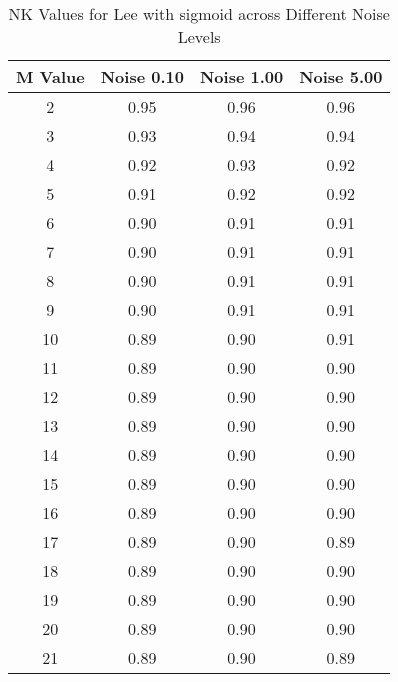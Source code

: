 \begin{table}[htb]
\small
\centering
\begin{tabular}{|c|c|c|c|} \hline
M Value & Noise 0.10 & Noise 1.00 & Noise 5.00 \\ \hline
2 & 0.95 & 0.96 & 0.96 \\ \hline
3 & 0.93 & 0.94 & 0.94 \\ \hline
4 & 0.92 & 0.93 & 0.92 \\ \hline
5 & 0.91 & 0.92 & 0.92 \\ \hline
6 & 0.90 & 0.91 & 0.91 \\ \hline
7 & 0.90 & 0.91 & 0.91 \\ \hline
8 & 0.90 & 0.91 & 0.91 \\ \hline
9 & 0.90 & 0.91 & 0.91 \\ \hline
10 & 0.89 & 0.90 & 0.91 \\ \hline
11 & 0.89 & 0.90 & 0.90 \\ \hline
12 & 0.89 & 0.90 & 0.90 \\ \hline
13 & 0.89 & 0.90 & 0.90 \\ \hline
14 & 0.89 & 0.90 & 0.90 \\ \hline
15 & 0.89 & 0.90 & 0.90 \\ \hline
16 & 0.89 & 0.90 & 0.90 \\ \hline
17 & 0.89 & 0.90 & 0.89 \\ \hline
18 & 0.89 & 0.90 & 0.90 \\ \hline
19 & 0.89 & 0.90 & 0.90 \\ \hline
20 & 0.89 & 0.90 & 0.90 \\ \hline
21 & 0.89 & 0.90 & 0.89 \\ \hline
\end{tabular}
\caption{NK Values for Lee with sigmoid across Different Noise Levels}
\end{table}

